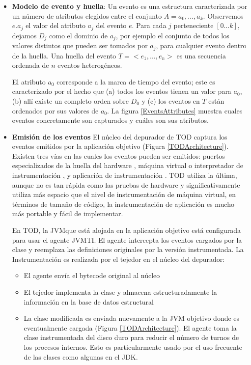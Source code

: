 \documentclass[12pt,legalpaper]{report}
\begin{document}
\begin{itemize}

	\item \textbf{Modelo de evento y huella}: Un evento es una estructura caracterizada por un número de atributos elegidos entre el conjunto $A={a_0,\dots ,a_k}$. Observemos $e.a_j$ el valor del atributo $a_j$ del evento $e$.  Para cada $j$ perteneciente $[0\dots k]$, dejamos $D_j$ como el dominio de $a_j$, por ejemplo el conjunto de todos los valores distintos que pueden ser tomados por $a_j$, para cualquier evento dentro de la huella.  Una huella del evento $T=<e_{1},\dots ,e_{n}>$ es una secuencia ordenada de $n$ eventos heterogéneos.

El atributo $a_{0}$ corresponde a la marca de tiempo del evento; este es caracterizado por el hecho que (a) todos los eventos tienen un valor para $a_{0}$, (b) allí existe un completo orden sobre $D_{0}$ y (c) los eventos en $T$ están ordenados por sus valores de $a_{0}$. La figura \ref{EventsAttributes} muestra cuales eventos concretamente son capturados y cuáles son sus atributos.

	\item \textbf{Emisión de los eventos} El núcleo del depurador de TOD captura los eventos emitidos por la aplicación objetivo (Figura \ref{TODArchitecture}).  Existen tres vías en las cuales los eventos pueden ser emitidos:  puertos especializados de la huella del hardware \cite{rtmdt},  máquina virtual o interpretador de instrumentación \cite{rooi}, y aplicación de instrumentación \cite{odb,zstep}.  TOD utiliza la última, aunque no es tan rápida como las pruebas de hardware y significativamente utiliza más espacio que el nivel de instrumentación de máquina virtual, en términos de tamaño de código, la instrumentación de aplicación es mucho más portable y fácil de implementar.

En TOD, la JVM\footnotemark[1] que está alojada en la aplicación objetivo está configurada para usar el agente  JVMTI\footnotemark[2] .  El agente intercepta los eventos cargados por la clase y reemplaza las definiciones originales por la versión instrumentada.  La Instrumentación es realizada por el tejedor en el núcleo del depurador:  
\begin{itemize}
	\item El agente envía el bytecode original al núcleo  
	\item El tejedor implementa la clase y almacena estructuradamente la información en la base de datos estructural
	\item La clase modificada es enviada nuevamente a la JVM objetivo donde es eventualmente cargada (Figura \ref{TODArchitecture}).  El agente toma la clase instrumentada del disco duro para reducir el número de turnos de los procesos internos.  Esto es  particularmente usado por el uso frecuente de las clases como algunas en el JDK.
\end{itemize}



\end{itemize}
\end{document}
